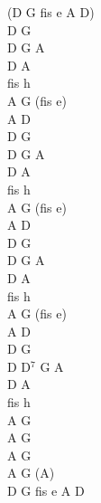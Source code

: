 \documentclass[a5paper, 10pt]{book}
\begin{document}
\begin{minipage}[t]{0.3\textwidth}
  (D G fis e A D)\\
  D G\\
  D G A\\
  D A\\
  fis h\\
  A G (fis e)\\
  A D\\

  D G\\
  D G A\\
  D A\\
  fis h\\
  A G (fis e)\\
  A D\\

  D G\\
  D G A\\
  D A\\
  fis h\\
  A G (fis e)\\
  A D\\

  D G\\
  D D$^7$ G A\\
  D A\\
  fis h\\
  A G\\
  A G\\
  A G\\
  A G (A)\\
  D G fis e A D\\
\end{minipage}

\newpage
\end{document}
